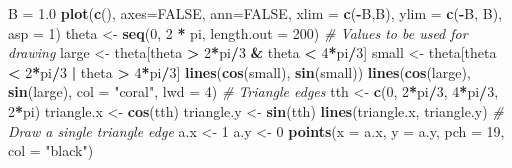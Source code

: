 \documentclass[
]{article}
\newenvironment{Shaded}{\begin{snugshade}}{\end{snugshade}}
\newcommand{\AttributeTok}[1]{\textcolor[rgb]{0.13,0.29,0.53}{#1}}
\newcommand{\CommentTok}[1]{\textcolor[rgb]{0.56,0.35,0.01}{\textit{#1}}}
\newcommand{\ConstantTok}[1]{\textcolor[rgb]{0.56,0.35,0.01}{#1}}
\newcommand{\DecValTok}[1]{\textcolor[rgb]{0.00,0.00,0.81}{#1}}
\newcommand{\FloatTok}[1]{\textcolor[rgb]{0.00,0.00,0.81}{#1}}
\newcommand{\FunctionTok}[1]{\textcolor[rgb]{0.13,0.29,0.53}{\textbf{#1}}}
\newcommand{\NormalTok}[1]{#1}
\newcommand{\OtherTok}[1]{\textcolor[rgb]{0.56,0.35,0.01}{#1}}
\newcommand{\SpecialCharTok}[1]{\textcolor[rgb]{0.81,0.36,0.00}{\textbf{#1}}}
\newcommand{\StringTok}[1]{\textcolor[rgb]{0.31,0.60,0.02}{#1}}
\begin{document}
\begin{Shaded}
\begin{Highlighting}[]
\NormalTok{B }\OtherTok{=} \FloatTok{1.0}
\FunctionTok{plot}\NormalTok{(}\FunctionTok{c}\NormalTok{(), }\AttributeTok{axes=}\ConstantTok{FALSE}\NormalTok{, }\AttributeTok{ann=}\ConstantTok{FALSE}\NormalTok{, }\AttributeTok{xlim =} \FunctionTok{c}\NormalTok{(}\SpecialCharTok{{-}}\NormalTok{B,B), }\AttributeTok{ylim  =} \FunctionTok{c}\NormalTok{(}\SpecialCharTok{{-}}\NormalTok{B, B), }\AttributeTok{asp =} \DecValTok{1}\NormalTok{)}
\NormalTok{theta }\OtherTok{\textless{}{-}} \FunctionTok{seq}\NormalTok{(}\DecValTok{0}\NormalTok{, }\DecValTok{2} \SpecialCharTok{*}\NormalTok{ pi, }\AttributeTok{length.out =} \DecValTok{200}\NormalTok{) }\CommentTok{\# Values to be used for drawing}
\NormalTok{large }\OtherTok{\textless{}{-}}\NormalTok{ theta[theta }\SpecialCharTok{\textgreater{}} \DecValTok{2}\SpecialCharTok{*}\NormalTok{pi}\SpecialCharTok{/}\DecValTok{3} \SpecialCharTok{\&}\NormalTok{ theta }\SpecialCharTok{\textless{}} \DecValTok{4}\SpecialCharTok{*}\NormalTok{pi}\SpecialCharTok{/}\DecValTok{3}\NormalTok{]}
\NormalTok{small }\OtherTok{\textless{}{-}}\NormalTok{ theta[theta }\SpecialCharTok{\textless{}} \DecValTok{2}\SpecialCharTok{*}\NormalTok{pi}\SpecialCharTok{/}\DecValTok{3} \SpecialCharTok{|}\NormalTok{ theta }\SpecialCharTok{\textgreater{}} \DecValTok{4}\SpecialCharTok{*}\NormalTok{pi}\SpecialCharTok{/}\DecValTok{3}\NormalTok{]}
\FunctionTok{lines}\NormalTok{(}\FunctionTok{cos}\NormalTok{(small), }\FunctionTok{sin}\NormalTok{(small))}
\FunctionTok{lines}\NormalTok{(}\FunctionTok{cos}\NormalTok{(large), }\FunctionTok{sin}\NormalTok{(large), }\AttributeTok{col =} \StringTok{"coral"}\NormalTok{, }\AttributeTok{lwd =} \DecValTok{4}\NormalTok{)}
\CommentTok{\# Triangle edges}
\NormalTok{tth }\OtherTok{\textless{}{-}} \FunctionTok{c}\NormalTok{(}\DecValTok{0}\NormalTok{, }\DecValTok{2}\SpecialCharTok{*}\NormalTok{pi}\SpecialCharTok{/}\DecValTok{3}\NormalTok{, }\DecValTok{4}\SpecialCharTok{*}\NormalTok{pi}\SpecialCharTok{/}\DecValTok{3}\NormalTok{, }\DecValTok{2}\SpecialCharTok{*}\NormalTok{pi)}
\NormalTok{triangle.x }\OtherTok{\textless{}{-}} \FunctionTok{cos}\NormalTok{(tth)}
\NormalTok{triangle.y }\OtherTok{\textless{}{-}} \FunctionTok{sin}\NormalTok{(tth)}
\FunctionTok{lines}\NormalTok{(triangle.x, triangle.y)}
\CommentTok{\# Draw a single triangle edge}
\NormalTok{a.x }\OtherTok{\textless{}{-}} \DecValTok{1}
\NormalTok{a.y }\OtherTok{\textless{}{-}} \DecValTok{0}
\FunctionTok{points}\NormalTok{(}\AttributeTok{x =}\NormalTok{ a.x, }\AttributeTok{y =}\NormalTok{ a.y, }\AttributeTok{pch =} \DecValTok{19}\NormalTok{, }\AttributeTok{col =} \StringTok{"black"}\NormalTok{)}
\end{Highlighting}
\end{Shaded}
\end{document}
